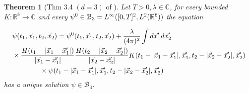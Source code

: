 \documentclass[b5paper,draft,openbib,12pt]{memoir}
\newtheorem{Thm}[Def]{Theorem}
\begin{document}


\begin{Thm}[Thm 3.4 \((d=3)\) of \cite{lienertfirst}]
Let \(T>0, \lambda\in\mathbb{C}\), for every bounded \(K:\mathbb{R}^8\rightarrow\mathbb{C}\) and every
\(\psi^{0} \in\mathcal{B}_3=L^\infty([0,T]^2,L^2(\mathbb{R}^6))\)
the equation 

\begin{align*}
&\psi(t_1,{\vec{x}}_1,t_2,{\vec{x}}_2)=\psi^{0}(t_1,{\vec{x}}_1,t_2,{\vec{x}}_2)+\frac{\lambda}{(4\pi)^2}\int d{\vec{x}}_1' d{\vec{x}}_2'\\
&\times \frac{H(t_1-|{\vec{x}}_1-{\vec{x}}_1'|)}{|{\vec{x}}_1-{\vec{x}}_1'|}\frac{H(t_2-|{\vec{x}}_2-{\vec{x}}_2'|)}{|{\vec{x}}_2-{\vec{x}}_2'|}K(t_1-|{\vec{x}}_1-{\vec{x}}_1'|,{\vec{x}}_1',t_2-|{\vec{x}}_2-{\vec{x}}_2'|,{\vec{x}}_2')\\
&\quad\quad\quad\quad \times\psi(t_1-|{\vec{x}}_1-{\vec{x}}_1'|,{\vec{x}}_1',t_2-|{\vec{x}}_2-{\vec{x}}_2'|,{\vec{x}}_2')
\end{align*}
has a unique solution \(\psi\in\mathcal{B}_3\).
\end{Thm}
\end{document}
